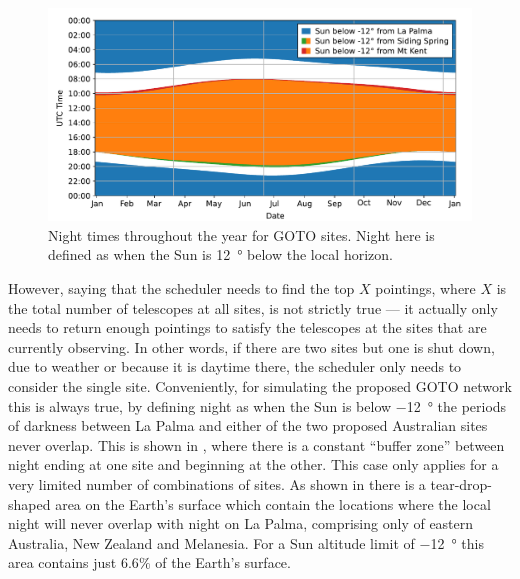 \begin{colsection}
\newpage

\begin{figure}[t]
    \begin{center}
        \includegraphics[width=\linewidth]{images/nights.pdf}
    \end{center}
    \caption[Night times throughout the year for GOTO sites]{
        Night times throughout the year for GOTO sites. Night here is defined as when the Sun is \SI{12}{\degree} below the local horizon.
    }\label{fig:nights}
\end{figure}

However, saying that the scheduler needs to find the top $X$ pointings, where $X$ is the total number of telescopes at all sites, is not strictly true --- it actually only needs to return enough pointings to satisfy the telescopes at the sites that are currently observing. In other words, if there are two sites but one is shut down, due to weather or because it is daytime there, the scheduler only needs to consider the single site. Conveniently, for simulating the proposed GOTO network this is always true, by defining night as when the Sun is below \SI{-12}{\degree} the periods of darkness between La Palma and either of the two proposed Australian sites never overlap. This is shown in , where there is a constant ``buffer zone'' between night ending at one site and beginning at the other. This case only applies for a very limited number of combinations of sites. As shown in  there is a tear-drop-shaped area on the Earth's surface which contain the locations where the local night will never overlap with night on La Palma, comprising only of eastern Australia, New Zealand and Melanesia. For a Sun altitude limit of \SI{-12}{\degree} this area contains just $6.6 \%$ of the Earth's surface.


\end{colsection}
